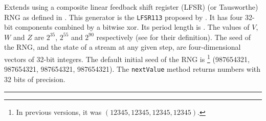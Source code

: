
Extends  using a composite linear feedback
shift register (LFSR) (or Tausworthe) RNG as defined in
\cite{rLEC96a,rTEZ91b}.
This generator is the \texttt{LFSR113} proposed by \cite{rLEC99a}.
It has four 32-bit components combined by a bitwise xor.
Its period length is 
. The values of $V$, $W$ and $Z$ are $2^{35}$,
$2^{55}$ and $2^{90}$ respectively (see  for their
definition). The seed of the RNG, and the state of a stream at any given
step, are four-dimensional vectors of 32-bit integers.
The default initial seed of the RNG is
\footnote{In previous versions, it was $(12345, 12345, 12345, 12345)$.}
(987654321, 987654321, 987654321, 987654321).
The \texttt{nextValue} method returns numbers with 32 bits of precision.


\bigskip\hrule

